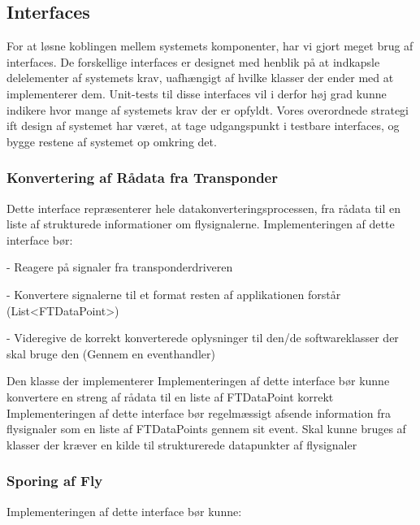 \subsection{Interfaces}
For at løsne koblingen mellem systemets komponenter, har vi gjort meget brug af interfaces. 
De forskellige interfaces er designet med henblik på at indkapsle delelementer af systemets krav, uafhængigt af hvilke klasser der ender med at implementerer dem.
Unit-tests til disse interfaces vil i derfor høj grad kunne indikere hvor mange af systemets krav der er opfyldt. Vores overordnede strategi ift design af systemet har været, at tage udgangspunkt i testbare interfaces, og bygge restene af systemet op omkring det.

\subsubsection{Konvertering af Rådata fra Transponder}
Dette interface repræsenterer hele datakonverteringsprocessen, fra rådata til en liste af strukturede informationer om flysignalerne.
Implementeringen af dette interface bør:

- Reagere på signaler fra transponderdriveren

- Konvertere signalerne til et format resten af applikationen forstår (List<FTDataPoint>)

- Videregive de korrekt konverterede oplysninger til den/de softwareklasser der skal bruge den (Gennem en eventhandler)

Den klasse der implementerer
Implementeringen af dette interface bør kunne konvertere en streng af rådata til en liste af FTDataPoint korrekt
Implementeringen af dette interface bør regelmæssigt afsende information fra flysignaler som en liste af FTDataPoints gennem sit event. Skal kunne bruges af klasser der kræver en kilde til strukturerede datapunkter af flysignaler
\subsubsection{Sporing af Fly}


Implementeringen af dette interface bør kunne:

